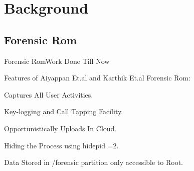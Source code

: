 \documentclass[12pt]{beamer}
\begin{document}
\section{Background}

\subsection{Forensic Rom}
\begin{frame}{Forensic Rom}{Work Done Till Now}
  \begin{itemize}
  \item {
   Features of  Aiyappan Et.al \cite{Aiyappan} and Karthik Et.al \cite{Karthik} Forensic Rom:
   
   \bigskip
   \item{
   Captures All User Activities.}
   
   \bigskip 
   \item{
   Key-logging and Call Tapping Facility.}
   
   \bigskip
   \item{
   Opportunistically Uploads In Cloud.}
   
   \bigskip
   \item{
   Hiding the Process using hidepid =2.
}

	\bigskip
   \item{
   Data Stored in /forensic partition only accessible to Root.}
   
   
  }
  
  
  \end{itemize}
\end{frame}
\end{document}
